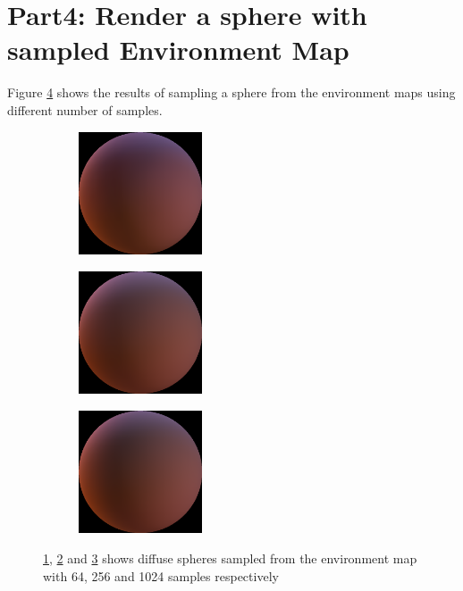 \documentclass[fleqn, hidelinks]{article} %
\begin{document}
\section{Part4: Render a sphere with sampled Environment Map}

Figure \ref{fig:Part4} shows the results of sampling a sphere from the environment maps using different number of samples.

\begin{figure}
        \centering
        \begin{subfigure}[b]{\textwidth}
                \centering
                \includegraphics[width=0.4\textwidth]{imgs/Part4/sphere64.png}
                \caption{}
                \label{fig:sphere64}
        \end{subfigure}
        \begin{subfigure}[b]{\textwidth}
                \centering
                \includegraphics[width=0.4\textwidth]{imgs/Part4/sphere256.png}
                \caption{}
                \label{fig:sphere256}
        \end{subfigure}
        \begin{subfigure}[b]{\textwidth}
                \centering
                \includegraphics[width=0.4\textwidth]{imgs/Part4/sphere1024.png}
                \caption{}
                \label{fig:sphere1024}
        \end{subfigure}
        \caption{\ref{fig:sphere64}, \ref{fig:sphere256} and \ref{fig:sphere1024} shows diffuse spheres sampled from the environment map with 64, 256 and 1024 samples respectively}\label{fig:Part4}
\end{figure}
\end{document}
